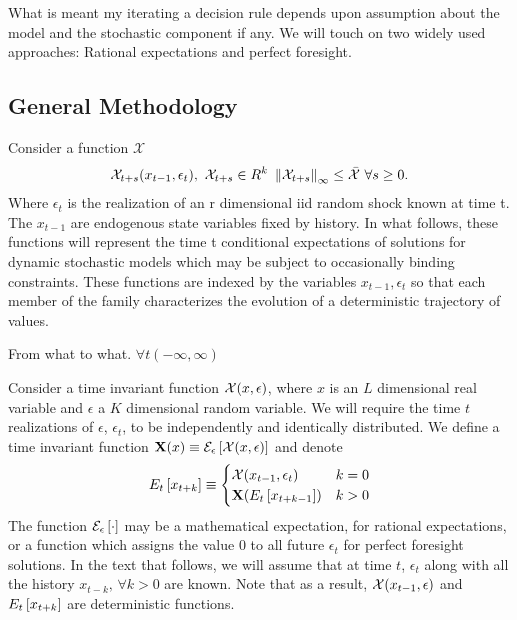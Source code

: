 \documentclass[12pt]{article}
\begin{document}
What is meant my iterating a decision rule depends upon assumption about the
model and the stochastic component if any.
We will  touch on two widely used approaches: Rational expectations and 
perfect foresight. 

\subsection{General Methodology}
\label{sec:general-methodology}



 Consider a function $\mathcal{X} $
 \begin{gather}
   \mathcal{X}_{t+s}(x_{t-1},\epsilon_t), \,\,\mathcal{X}_{t+s} \in{R^k}\,\,\left\lVert\mathcal{X}_{t+s}\right\rVert_\infty  \le \bar{\mathcal{X}}\,\,\forall s\ge 0 \label{fFamily}.
 \end{gather}
Where $\epsilon_t$ is the realization of an r dimensional iid random shock  known at time t. The $x_{t-1}$ are endogenous state variables fixed by history.  
In what follows, these functions will represent the time t conditional expectations of solutions for dynamic stochastic models which may be subject to occasionally binding constraints.  These functions are indexed by the variables $x_{t-1}, \epsilon_t$ so that each member of the family characterizes the evolution of a deterministic trajectory of values.

From what to what.  $\forall t (-\infty,\infty)$ 

Consider a time invariant function $\mathcal{X}(x,\epsilon)$, where $x$ is an $L$ dimensional real variable and $\epsilon$ a $K$ dimensional random variable. 
We will require
the time $t$ realizations of $\epsilon$, $\epsilon_t$, to be independently and identically distributed.
We define a time invariant function $\mathbf{X}(x)\equiv \mathcal{E}_{\epsilon} \left [\mathcal{X}(x,\epsilon) \right ]$ and denote
\begin{gather*}
E_{t} \left [x_{t+k} \right ]\equiv\begin{cases}
\mathcal{X}{(x_{t-1},\epsilon_t)} &k=0\\
\mathbf{X}{(E_{t} \left [x_{t+k-1} \right ])} &k>0
\end{cases}
\end{gather*}
The function $\mathcal{E}_{\epsilon} \left [\cdot \right ]$ may be a mathematical expectation, for rational expectations, or a function which assigns the value $0$ to all future $\epsilon_t$ for perfect foresight solutions.
In the text that follows, we will assume that at time $t$, $\epsilon_t$ along with all the history $x_{t-k},\, \forall k>0$ are known.
Note that as a result, 
$\mathcal{X}{(x_{t-1},\epsilon)}$ and 
$E_{t} \left [x_{t+k} \right ]$ are deterministic functions.  
\end{document}
